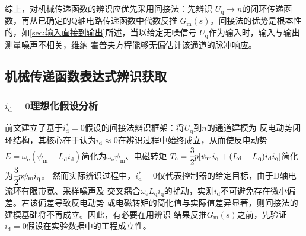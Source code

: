 综上，对机械传递函数的辨识应优先采用间接法：先辨识
\(U_{\mathrm{q}}\to n\)的闭环传递函数，再从已确定的Q轴电路传递函数中代数反推
\(G_{\mathrm{m}}(s)\)。间接法的优势是根本性的，如\ref{sec:输入直接到输出}所述，当以给定无噪信号
\(U_{\mathrm{q}}\)作为输入时，输入与输出测量噪声不相关，维纳-霍普夫方程能够无偏估计该通道的脉冲响应。

\subsection{机械传递函数表达式辨识获取}
\subsubsection{\(i_{\mathrm{d}}=0\)理想化假设分析}
前文建立了基于\(i_{\mathrm{d}}^*=0\)假设的间接法辨识框架：将\(U_{\mathrm{q}}\)到\(n\)的通道建模为
反电动势闭环结构，其核心在于认为\(i_{\mathrm{d}}\approx 0\)在辨识过程中始终成立，从而使反电动势
\(E=\omega_{\mathrm{e}}(\psi_{\mathrm{m}}+L_{\mathrm{d}}i_{\mathrm{d}})\)简化为\(\omega_{\mathrm{e}}\psi_{\mathrm{m}}\)、电磁转矩
\(T_{\mathrm{e}}=\cfrac{3}{2}p[\psi_{\mathrm{m}}i_{\mathrm{q}}+(L_{\mathrm{d}}-L_{\mathrm{q}})i_{\mathrm{d}}i_{\mathrm{q}}]\)简化为\(\cfrac{3}{2}p\psi_{\mathrm{m}}i_{\mathrm{q}}\)。
然而实际辨识过程中，\(i_{\mathrm{d}}^*=0\)仅代表控制器的给定目标，由于D轴电流环有限带宽、采样噪声及
交叉耦合\(\omega_{\mathrm{e}}L_{\mathrm{q}}i_{\mathrm{q}}\)的扰动，实测\(i_{\mathrm{d}}\)不可避免存在微小偏差。若该偏差导致反电动势
或电磁转矩的简化值与实际值差异显著，则间接法的建模基础将不再成立。因此，有必要在用辨识
结果反推\(G_{\mathrm{m}}(s)\)之前，先验证\(i_{\mathrm{d}}=0\)假设在实验数据中的工程成立性。

